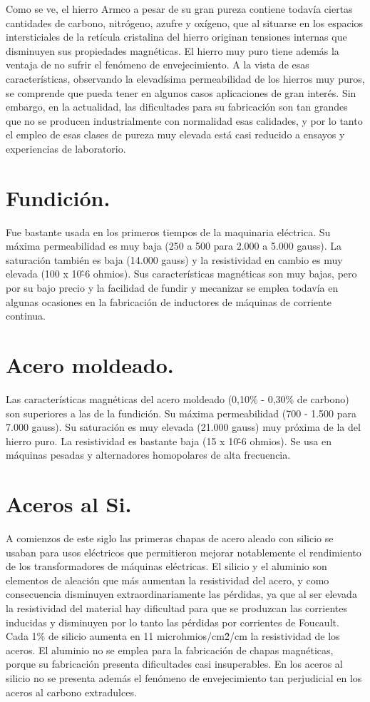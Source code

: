 \documentclass[12pt,a4paper]{article}
\begin{document}
Como se ve, el hierro Armco a pesar de su gran pureza contiene todavía ciertas cantidades de carbono, nitrógeno, azufre y oxígeno, que al situarse en los espacios intersticiales de la retícula cristalina del hierro originan tensiones internas que disminuyen sus propiedades magnéticas. El hierro muy puro tiene además la ventaja de no sufrir el fenómeno de envejecimiento. A la vista de esas características, observando la elevadísima permeabilidad de los hierros muy puros, se comprende que pueda tener en algunos casos aplicaciones de gran interés. Sin embargo, en la actualidad, las dificultades para su fabricación son tan grandes que no se producen industrialmente con normalidad esas calidades, y por lo tanto el empleo de esas clases de pureza muy elevada está casi reducido a ensayos y experiencias de laboratorio.

\section{Fundición.}
Fue bastante usada en los primeros tiempos de la maquinaria eléctrica. Su máxima permeabilidad es muy baja (250 a 500 para 2.000 a 5.000 gauss). La saturación también es baja (14.000 gauss) y la resistividad en cambio es muy elevada (100 x 10\^-6 ohmios). 
Sus características magnéticas son muy bajas, pero por su bajo precio y la facilidad de fundir y mecanizar se emplea todavía en algunas ocasiones en la fabricación de inductores de máquinas de corriente continua.

\section{Acero moldeado.}
Las características magnéticas del acero moldeado (0,10\% - 0,30\% de carbono) son superiores a las de la fundición. Su máxima permeabilidad (700 - 1.500 para 7.000 gauss). Su saturación es muy elevada (21.000 gauss) muy próxima de la del hierro puro. La resistividad es bastante baja (15 x 10\^-6 ohmios). Se usa en máquinas pesadas y alternadores homopolares de alta frecuencia.


\section{Aceros al Si.}

A comienzos de este siglo las primeras chapas de acero aleado con silicio se usaban para usos eléctricos que permitieron mejorar notablemente el rendimiento de los transformadores de máquinas eléctricas. El silicio y el aluminio son elementos de aleación que más aumentan la resistividad del acero, y como consecuencia disminuyen extraordinariamente las pérdidas, ya que al ser elevada la resistividad del material hay dificultad para que se produzcan las corrientes inducidas y disminuyen por lo tanto las pérdidas por corrientes de Foucault. Cada 1\% de silicio aumenta en 11 microhmios/cm\^2/cm la resistividad de los aceros. El aluminio no se emplea para la fabricación de chapas magnéticas, porque su fabricación presenta dificultades casi insuperables. En los aceros al silicio no se presenta además el fenómeno de envejecimiento tan perjudicial en los aceros al carbono extradulces.
\end{document}

